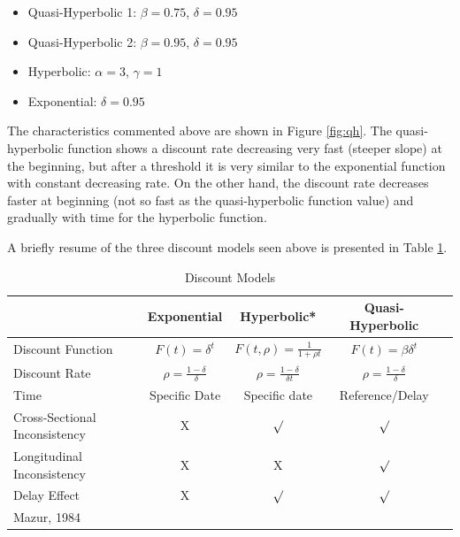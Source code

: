 \documentclass[]{article}
\providecommand{\tightlist}{%
  \setlength{\itemsep}{0pt}\setlength{\parskip}{0pt}}
\begin{document}
\begin{itemize}
\tightlist
\item
  Quasi-Hyperbolic 1: \(\beta = 0.75\), \(\delta = 0.95\)
\item
  Quasi-Hyperbolic 2: \(\beta = 0.95\), \(\delta = 0.95\)
\item
  Hyperbolic: \(\alpha = 3\), \(\gamma = 1\)
\item
  Exponential: \(\delta = 0.95\)
\end{itemize}

The characteristics commented above are shown in Figure \ref{fig:qh}. The quasi-hyperbolic function shows a discount rate decreasing very fast (steeper slope) at the beginning, but after a threshold it is very similar to the exponential function with constant decreasing rate. On the other hand, the discount rate decreases faster at beginning (not so fast as the quasi-hyperbolic function value) and gradually with time for the hyperbolic function.

A briefly resume of the three discount models seen above is presented in Table \ref{tab:dis}.

\begin{table}
    \caption {Discount Models} \label{tab:dis}
    \centering
    \begin{tabular}{l c c c c}
        \hline
                          & Exponential                    & Hyperbolic*                         & Quasi-Hyperbolic \\ 
        \hline
        Discount Function & $F(t)= \delta^t$               & $F(t, \rho)= \frac{1}{1 + \rho t}$  & $F(t)=\beta \delta^t$ \\ 
        Discount Rate     & $\rho=\frac{1-\delta}{\delta}$ & $\rho=\frac{1-\delta}{\delta t}$    & $\rho=\frac{1-\delta}{\delta}$ \\ 
        Time              & Specific Date                  & Specific date                       & Reference/Delay  \\ 
        Cross-Sectional Inconsistency & X                  & $\surd$                             & $\surd$ \\ 
        Longitudinal Inconsistency    & X                  & X                                   & $\surd$ \\ 
        Delay Effect                  & X                  & $\surd$                             & $\surd$ \\ 
        \hline
        \begin{minipage}{0.2\textwidth}
            {\footnotesize * Mazur, 1984}
        \end{minipage}
    \end{tabular}
\end{table}
\end{document}
